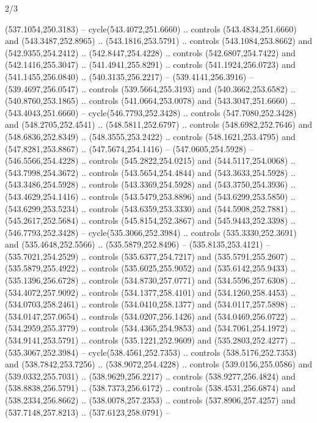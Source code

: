 \begin{flagdescription}{2/3}
\begin{scope}[xshift=0.5\flaglength,yshift=0.5\flagwidth,scale=\flagwidth/495.65]
\begin{scope}[y=0.8pt, x=0.8pt, yscale=-1,shift={(-463.76,-309.78)}]
  (537.1054,250.3183) -- cycle(543.4072,251.6660) .. controls
  (543.4834,251.6660) and (543.3487,252.8965) .. (543.1816,253.5791) .. controls
  (543.1084,253.8662) and (542.9355,254.2412) .. (542.8447,254.4228) .. controls
  (542.6807,254.7422) and (542.1416,255.3047) .. (541.4941,255.8291) .. controls
  (541.1924,256.0723) and (541.1455,256.0840) .. (540.3135,256.2217) --
  (539.4141,256.3916) -- (539.4697,256.0547) .. controls (539.5664,255.3193) and
  (540.3662,253.6582) .. (540.8760,253.1865) .. controls (541.0664,253.0078) and
  (543.3047,251.6660) .. (543.4043,251.6660) -- cycle(546.7793,252.3428) ..
  controls (547.7080,252.3428) and (548.2705,252.4541) .. (548.5811,252.6797) ..
  controls (548.6982,252.7646) and (548.6836,252.8349) .. (548.3555,253.2422) ..
  controls (548.1621,253.4795) and (547.8281,253.8867) .. (547.5674,254.1416) --
  (547.0605,254.5928) -- (546.5566,254.4228) .. controls (545.2822,254.0215) and
  (544.5117,254.0068) .. (543.7998,254.3672) .. controls (543.5654,254.4844) and
  (543.3633,254.5928) .. (543.3486,254.5928) .. controls (543.3369,254.5928) and
  (543.3750,254.3936) .. (543.4629,254.1416) .. controls (543.5479,253.8896) and
  (543.6299,253.5850) .. (543.6299,253.5234) .. controls (543.6359,253.3330) and
  (544.5908,252.7881) .. (545.2617,252.5684) .. controls (545.8154,252.3867) and
  (545.9443,252.3398) .. (546.7793,252.3428) -- cycle(535.3066,252.3984) ..
  controls (535.3330,252.3691) and (535.4648,252.5566) .. (535.5879,252.8496) --
  (535.8135,253.4121) -- (535.7021,254.2529) .. controls (535.6377,254.7217) and
  (535.5791,255.2607) .. (535.5879,255.4922) .. controls (535.6025,255.9052) and
  (535.6142,255.9433) .. (535.1396,256.6728) .. controls (534.8730,257.0771) and
  (534.5596,257.6308) .. (534.4072,257.9092) .. controls (534.1377,258.4101) and
  (534.1260,258.4453) .. (534.0703,258.2461) .. controls (534.0410,258.1377) and
  (534.0117,257.5898) .. (534.0147,257.0654) .. controls (534.0207,256.1426) and
  (534.0469,256.0722) .. (534.2959,255.3779) .. controls (534.4365,254.9853) and
  (534.7061,254.1972) .. (534.9141,253.5791) .. controls (535.1221,252.9609) and
  (535.2803,252.4277) .. (535.3067,252.3984) -- cycle(538.4561,252.7353) ..
  controls (538.5176,252.7353) and (538.7842,253.7256) .. (538.9072,254.4228) ..
  controls (539.0156,255.0586) and (539.0332,255.7031) .. (538.9629,256.2217) ..
  controls (538.9277,256.4824) and (538.8838,256.5791) .. (538.7373,256.6172) ..
  controls (538.4531,256.6874) and (538.2334,256.8662) .. (538.0078,257.2353) ..
  controls (537.8906,257.4257) and (537.7148,257.8213) .. (537.6123,258.0791) --

\end{scope}
\end{scope}
\end{flagdescription}

